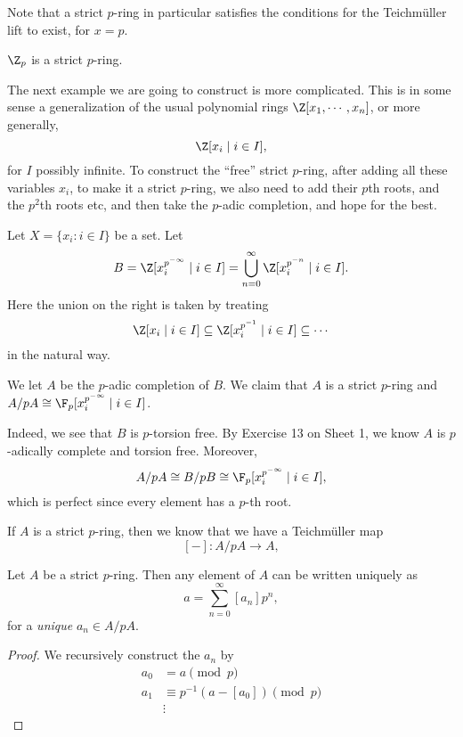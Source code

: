 \documentclass[a4paper]{article}
\begin{document}
Note that a strict $p$-ring in particular satisfies the conditions for the Teichm\"uller lift to exist, for $x = p$.
\begin{eg}
  $\Z_p$ is a strict $p$-ring.
\end{eg}

The next example we are going to construct is more complicated. This is in some sense a generalization of the usual polynomial rings $\Z[x_1, \cdots, x_n]$, or more generally,
\[
  \Z[x_i \mid i \in I],
\]
for $I$ possibly infinite. To construct the ``free'' strict $p$-ring, after adding all these variables $x_i$, to make it a strict $p$-ring, we also need to add their $p$th roots, and the $p^2$th roots etc, and then take the $p$-adic completion, and hope for the best.

\begin{eg}
  Let $X = \{x_i: i \in I\}$ be a set. Let
  \[
    B = \Z[x_i^{p^{-\infty}}\mid i \in I] = \bigcup_{n = 0}^\infty \Z[x_i^{p^{-n}}\mid i \in I].
  \]
  Here the union on the right is taken by treating
  \[
    \Z[x_i \mid i \in I] \subseteq \Z [x_i^{p^{-1}} \mid i \in I] \subseteq \cdots
  \]
  in the natural way.

  We let $A$ be the $p$-adic completion of $B$. We claim that $A$ is a strict $p$-ring and $A/pA \cong \F_p[x_i^{p^{-\infty}}\mid i \in I]$.

  Indeed, we see that $B$ is $p$-torsion free. By Exercise 13 on Sheet 1, we know $A$ is $p$-adically complete and torsion free. Moreover,
  \[
    A/pA \cong B/pB \cong \F_p[x_i^{p^{-\infty}}\mid i \in I],
  \]
  which is perfect since every element has a $p$-th root. %
\end{eg}

If $A$ is a strict $p$-ring, then we know that we have a Teichm\"uller map
\[
  [-]: A/pA \to A,
\]
\begin{lemma}
  Let $A$ be a strict $p$-ring. Then any element of $A$ can be written uniquely as
  \[
    a = \sum_{n = 0}^\infty [a_n] p^n,
  \]
  for a \emph{unique} $a_n \in A/pA$.
\end{lemma}

\begin{proof}
  We recursively construct the $a_n$ by
  \begin{align*}
    a_0 &= a \pmod p\\
    a_1 &\equiv p^{-1}(a - [a_0]) \pmod p\\
    &\vdots
  \end{align*}
\end{proof}
\end{document}
